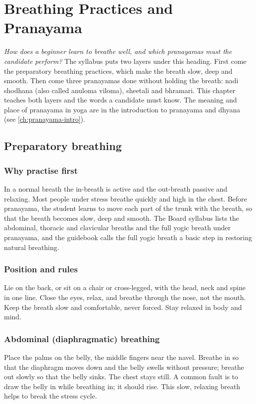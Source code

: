 \chapter{Breathing Practices and Pranayama}
\label{ch:pranayama}

\emph{How does a beginner learn to breathe well, and which pranayamas must the candidate perform?}
The syllabus puts two layers under this heading. First come the preparatory breathing practices, which make the breath slow, deep and smooth. Then come three pranayamas done without holding the breath: nadi shodhana (also called anuloma viloma), sheetali and bhramari. This chapter teaches both layers and the words a candidate must know. The meaning and place of pranayama in yoga are in the introduction to pranayama and dhyana (see \cref{ch:pranayama-intro}).

\section{Preparatory breathing}

\subsection*{Why practise first}
In a normal breath the in-breath is active and the out-breath passive and relaxing. Most people under stress breathe quickly and high in the chest. Before pranayama, the student learns to move each part of the trunk with the breath, so that the breath becomes slow, deep and smooth. The Board syllabus lists the abdominal, thoracic and clavicular breaths and the full yogic breath under pranayama, and the guidebook calls the full yogic breath a basic step in restoring natural breathing.

\subsection*{Position and rules}
Lie on the back, or sit on a chair or cross-legged, with the head, neck and spine in one line. Close the eyes, relax, and breathe through the nose, not the mouth. Keep the breath slow and comfortable, never forced. Stay relaxed in body and mind.

\subsection*{Abdominal (diaphragmatic) breathing}
Place the palms on the belly, the middle fingers near the navel. Breathe in so that the diaphragm moves down and the belly swells without pressure; breathe out slowly so that the belly sinks. The chest stays still. A common fault is to draw the belly in while breathing in; it should rise. This slow, relaxing breath helps to break the stress cycle.

